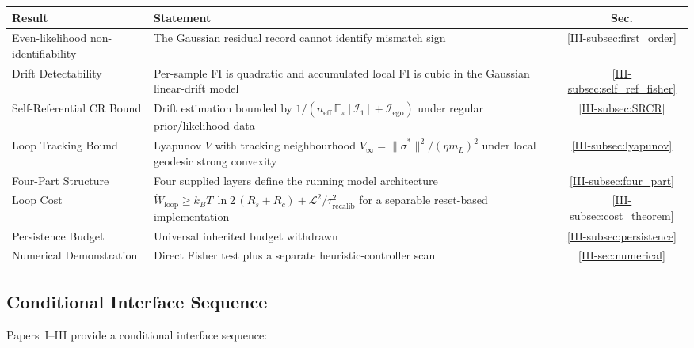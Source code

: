 \documentclass[12pt,a4paper,openany]{book}
\begin{document}
\begin{center}
\small
\setlength{\tabcolsep}{4pt}%
\begin{tabular}{@{}lP{6cm}c@{}}
\toprule
\textbf{Result} & \textbf{Statement} & \textbf{Sec.} \\
\midrule
Even-likelihood non-identifiability
  & The Gaussian residual record cannot identify mismatch sign
  & \ref{III-subsec:first_order} \\[3pt]
Drift Detectability
  & Per-sample FI is quadratic and accumulated local FI is cubic in the
    Gaussian linear-drift model
  & \ref{III-subsec:self_ref_fisher} \\[3pt]
Self-Referential CR Bound
  & Drift estimation bounded by
    $1/(n_{\mathrm{eff}}\,\mathbb E_\pi[\mathcal I_1]
    + \mathcal{I}_{\mathrm{ego}})$ under regular prior/likelihood data
  & \ref{III-subsec:SRCR} \\[3pt]
Loop Tracking Bound
  & Lyapunov $V$ with tracking neighbourhood
    $V_\infty = \|\dot{\sigma}^*\|^2/(\eta m_L)^2$ under local
    geodesic strong convexity
  & \ref{III-subsec:lyapunov} \\[3pt]
Four-Part Structure
  & Four supplied layers define the running model architecture
  & \ref{III-subsec:four_part} \\[3pt]
Loop Cost
  & $\dot{W}_{\mathrm{loop}} \geq k_BT\,\ln 2\,(R_s+R_c)
    + \mathcal{L}^2/\tau_{\mathrm{recalib}}^2$
    for a separable reset-based implementation
  & \ref{III-subsec:cost_theorem} \\[3pt]
Persistence Budget
  & Universal inherited budget withdrawn
  & \ref{III-subsec:persistence} \\[3pt]
Numerical Demonstration
  & Direct Fisher test plus a separate heuristic-controller scan
  & \ref{III-sec:numerical} \\
\bottomrule
\end{tabular}
\end{center}

\subsection{Conditional Interface Sequence}
\label{III-subsec:logic_chain}

Papers~I--III provide a conditional interface sequence:
\end{document}
